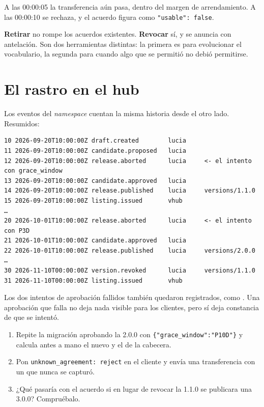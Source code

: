 A las 00:00:05 la transferencia aún pasa, dentro del margen de arrendamiento. A las 00:00:10 se rechaza, y el
acuerdo figura como \texttt{"usable": false}.

\begin{ideaClave}
\textbf{Retirar} no rompe los acuerdos existentes. \textbf{Revocar} sí, y se anuncia con antelación. Son dos
herramientas distintas: la primera es para evolucionar el vocabulario, la segunda para cuando algo que se
permitió no debió permitirse.
\end{ideaClave}

\section{El rastro en el hub}

Los eventos del \emph{namespace} cuentan la misma historia desde el otro lado. Resumidos:

\begin{lstlisting}[style=out]
10 2026-09-20T10:00:00Z draft.created        lucia
11 2026-09-20T10:00:00Z candidate.proposed   lucia
12 2026-09-20T10:00:00Z release.aborted      lucia     <- el intento con grace_window
13 2026-09-20T10:00:00Z candidate.approved   lucia
14 2026-09-20T10:00:00Z release.published    lucia     versions/1.1.0
15 2026-09-20T10:00:00Z listing.issued       vhub
…
20 2026-10-01T10:00:00Z release.aborted      lucia     <- el intento con P3D
21 2026-10-01T10:00:00Z candidate.approved   lucia
22 2026-10-01T10:00:00Z release.published    lucia     versions/2.0.0
…
30 2026-11-10T00:00:00Z version.revoked      lucia     versions/1.1.0
31 2026-11-10T00:00:00Z listing.issued       vhub
\end{lstlisting}

Los dos intentos de aprobación fallidos también quedaron registrados, como . Una aprobación
que falla no deja nada visible para los clientes, pero sí deja constancia de que se intentó.

\begin{retos}
\begin{enumerate}[leftmargin=*, itemsep=2pt]
  \item Repite la migración aprobando la 2.0.0 con \texttt{\{"grace\_window":"P10D"\}} y calcula antes a mano el
        nuevo  y el  de la cabecera.
  \item Pon \texttt{unknown\_agreement: reject} en el cliente y envía una transferencia con un  que
        nunca se capturó.
  \item ¿Qué pasaría con el acuerdo si en lugar de revocar la 1.1.0 se publicara una 3.0.0? Compruébalo.
\end{enumerate}
\end{retos}
